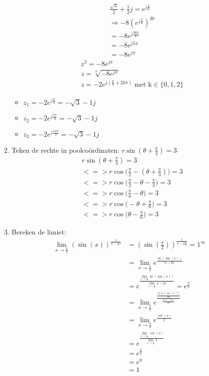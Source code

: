 \documentclass{article}
\begin{document}
\begin{enumerate}
\begin{align*}
    &\frac{\sqrt{3}}{2} + \frac{1}{2}j = e^{j\frac{\pi}{6}} \\
    &\Rightarrow -8(e^{j\frac{\pi}{6}})^{30} \\
    &= -8e^{j\frac{30\pi}{6}} \\ 
    &= -8e^{j5\pi} \\ 
    &= -8e^{j\pi} 
 \end{align*}
 \begin{align*}
  &z^{3} = -8e^{j\pi}  \\
  &z=\sqrt[3]{-8e^{j\pi}} \\
  &z = -2e^{j(\frac{\pi}{3} + 2k\pi)}\;\text{met k} \in \{0, 1, 2\}
 \end{align*}
 
 \begin{itemize}
  \item $z_1 = -2e^{j\frac{\pi}{3}} = -\sqrt{3} - 1j$
  \item $z_2 = -2e^{j\frac{7\pi}{3}} = -\sqrt{3} - 1j$
  \item $z_3 = -2e^{j\frac{14\pi}{3}} = -\sqrt{3} - 1j$
 \end{itemize}

\newpage
 \item Teken de rechte in poolcoördinaten: $r\sin(\theta + \frac{\pi}{3}) = 3$
 \begin{align*}
  &     r\sin(\theta + \frac{\pi}{3}) = 3  \\
  &<=> r\cos\biggl(\frac{\pi}{2} - (\theta + \frac{\pi}{3})\biggl) = 3 \\
  &<=> r\cos\biggl(\frac{\pi}{2} - \theta - \frac{\pi}{3}\biggl) = 3 \\
  &<=> r\cos\biggl(\frac{\pi}{6} - \theta\biggl) = 3 \\
  &<=> r\cos\biggl( - \theta + \frac{\pi}{6}\biggl) = 3 \\
  &<=> r\cos\biggl(\theta - \frac{\pi}{6}\biggl) = 3 
 \end{align*}


  \newpage
 \item Bereken de limiet:
      \begin{align*}
       \lim_{x\to\frac{\pi}{2}}(\sin(x))^{\frac{1}{\pi - 2x}} &= (\sin(\frac{\pi}{2}))^\frac{1}{\pi - 2\frac{\pi}{2}} = 1^{\infty} \\
       &= \lim_{x\to\frac{\pi}{2}} e^{\frac{\ln(\sin(x))}{\pi - 2x}} 
      \\ &= e^{\frac{\lim_{x\to\frac{\pi}{2}} \ln(\sin(x))}{\lim_{x\to\frac{\pi}{2}} \pi - 2x}} = e^{\frac{0}{0}}
      \\ &= \lim_{x\to\frac{\pi}{2}} e^{\frac{\frac{d[\ln(\sin(x))]}{dx}}{\frac{d[\pi - 2x]}{dx}}}
      \\ &= \lim_{x\to\frac{\pi}{2}} e^{\frac{\cot(x)}{2}} 
      \\ &=  e^{\frac{\lim_{x\to\frac{\pi}{2}}\cot(x)}{\lim_{x\to\frac{\pi}{2}}2}}
      \\ &= e^{\frac{0}{2}}
      \\ &= e^{0}
      \\ &= 1
      \end{align*} 

\end{enumerate}
 
 
\end{document}
